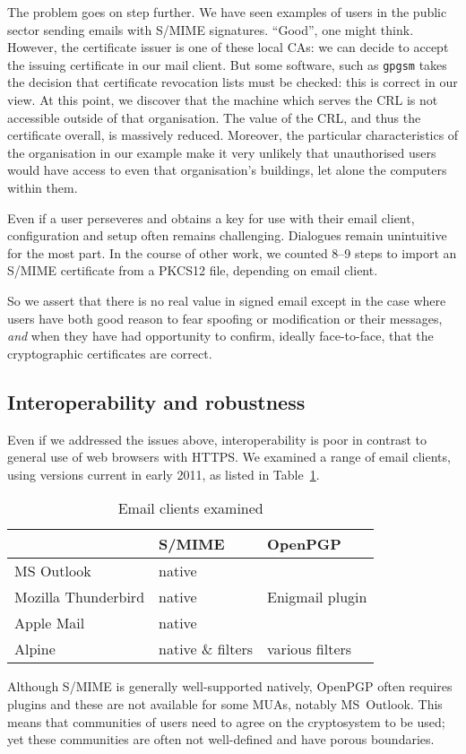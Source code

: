 \documentclass{article}
\begin{document}
The problem goes on step further.  We have seen examples of users in
the public sector sending emails with S/MIME signatures.  “Good”, one
might think.  However, the certificate issuer is one of these local CAs: we can
decide to accept the issuing certificate in our mail client.  But some
software, such as \verb|gpgsm| takes the decision
that certificate revocation lists must be checked: this is correct in our view.  At this point, we
discover that the machine which serves the CRL is not accessible
outside of that organisation.  The value of the CRL, and thus the
certificate overall, is massively reduced.  Moreover, the particular
characteristics of the organisation in our example make it very
unlikely that unauthorised users would have access to even that organisation's buildings, let alone the computers within them.

Even if a user perseveres and obtains a key for use with their email
client, configuration and setup often remains challenging.  Dialogues
remain unintuitive for the most part.  In the course of other work, we
counted 8--9 steps
to import an S/MIME certificate from a PKCS12 file, depending on email client.

So we assert that there is no real value in signed email except in the
case where users have both good reason to
fear spoofing or modification or their messages, \emph{and} when they
have had opportunity to confirm, ideally face-to-face, that the
cryptographic certificates are correct.

\subsection{Interoperability and robustness}\label{sec:interop}

Even if we addressed the issues above, interoperability is poor in
contrast to general use of web browsers with HTTPS.
We examined a range of email clients, using versions current in early 2011, as listed in
Table~\ref{tab:clients}.
\begin{table}
  \centering
  \begin{tabular}{|l|l|l|}
    \hline
    &S/MIME&OpenPGP\\
    \hline
    MS Outlook&native&\\
    Mozilla Thunderbird&native&Enigmail plugin\\
    Apple Mail&native&\\
    Alpine&native \& filters&various filters\\
    \hline
  \end{tabular}
\caption{Email clients examined\label{tab:clients}}
\end{table}
Although S/MIME is generally well-supported natively, OpenPGP often
requires plugins and these are not available for some MUAs, notably
MS~Outlook.  This means that communities of users need to agree on
the cryptosystem to be used; yet these communities are often not
well-defined and have porous boundaries.
\end{document}
